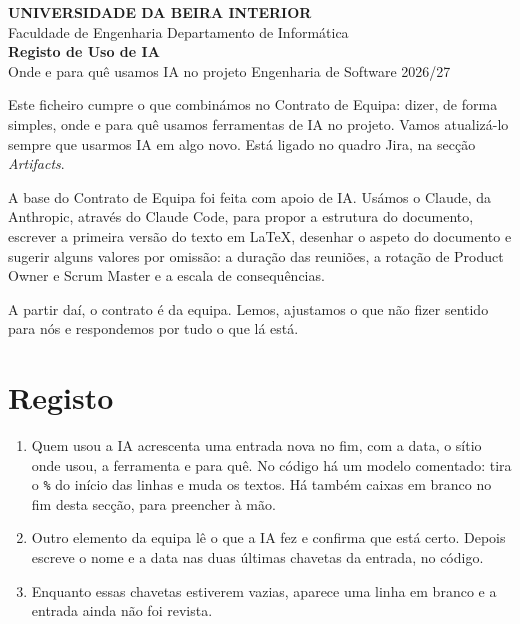 \documentclass[11pt,a4paper]{article}
\begin{document}
\thispagestyle{primeira}

\begin{tcolorbox}[colback=azul, colframe=azul, coltext=white, arc=3pt, boxrule=0pt,
    left=16pt, right=16pt, top=14pt, bottom=14pt]
  \sffamily
  {\footnotesize\bfseries\MakeUppercase{Universidade da Beira Interior}}\\[2pt]
  {\footnotesize Faculdade de Engenharia \textperiodcentered{} Departamento de Informática}\\[16pt]
  {\fontsize{28}{32}\selectfont\bfseries Registo de Uso de IA}\\[4pt]
  {\large Onde e para quê usamos IA no projeto \textperiodcentered{} Engenharia de Software 2026/27}
\end{tcolorbox}

Este ficheiro cumpre o que combinámos no Contrato de Equipa: dizer, de forma simples, onde e para quê usamos ferramentas de IA no projeto. Vamos atualizá-lo sempre que usarmos IA em algo novo. Está ligado no quadro Jira, na secção \textit{Artifacts}.

\begin{tcolorbox}[caixa, title={Declaração}, colback=azulclaro!60]
  A base do Contrato de Equipa foi feita com apoio de IA. Usámos o Claude, da Anthropic, através do Claude Code, para propor a estrutura do documento, escrever a primeira versão do texto em LaTeX, desenhar o aspeto do documento e sugerir alguns valores por omissão: a duração das reuniões, a rotação de Product Owner e Scrum Master e a escala de consequências.

  A partir daí, o contrato é da equipa. Lemos, ajustamos o que não fizer sentido para nós e respondemos por tudo o que lá está.
\end{tcolorbox}

\section{Registo}

\begin{tcolorbox}[caixa, title={Como se preenche}, colback=azulclaro!60]
  \begin{enumerate}
    \item Quem usou a IA acrescenta uma entrada nova no fim, com a data, o sítio onde usou, a ferramenta e para quê. No código há um modelo comentado: tira o \texttt{\%} do início das linhas e muda os textos. Há também caixas em branco no fim desta secção, para preencher à mão.
    \item Outro elemento da equipa lê o que a IA fez e confirma que está certo. Depois escreve o nome e a data nas duas últimas chavetas da entrada, no código.
    \item Enquanto essas chavetas estiverem vazias, aparece uma linha em branco e a entrada ainda não foi revista.
  \end{enumerate}
\end{tcolorbox}
\end{document}
